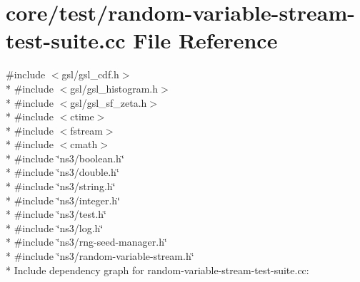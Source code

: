 \hypertarget{random-variable-stream-test-suite_8cc}{}\section{core/test/random-\/variable-\/stream-\/test-\/suite.cc File Reference}
\label{random-variable-stream-test-suite_8cc}
{\ttfamily \#include $<$gsl/gsl\+\_\+cdf.\+h$>$}\\*
{\ttfamily \#include $<$gsl/gsl\+\_\+histogram.\+h$>$}\\*
{\ttfamily \#include $<$gsl/gsl\+\_\+sf\+\_\+zeta.\+h$>$}\\*
{\ttfamily \#include $<$ctime$>$}\\*
{\ttfamily \#include $<$fstream$>$}\\*
{\ttfamily \#include $<$cmath$>$}\\*
{\ttfamily \#include \char`\"{}ns3/boolean.\+h\char`\"{}}\\*
{\ttfamily \#include \char`\"{}ns3/double.\+h\char`\"{}}\\*
{\ttfamily \#include \char`\"{}ns3/string.\+h\char`\"{}}\\*
{\ttfamily \#include \char`\"{}ns3/integer.\+h\char`\"{}}\\*
{\ttfamily \#include \char`\"{}ns3/test.\+h\char`\"{}}\\*
{\ttfamily \#include \char`\"{}ns3/log.\+h\char`\"{}}\\*
{\ttfamily \#include \char`\"{}ns3/rng-\/seed-\/manager.\+h\char`\"{}}\\*
{\ttfamily \#include \char`\"{}ns3/random-\/variable-\/stream.\+h\char`\"{}}\\*
Include dependency graph for random-\/variable-\/stream-\/test-\/suite.cc\+:
